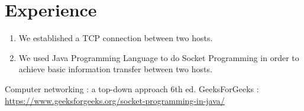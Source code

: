 \documentclass[11pt]{article}
\begin{document}
\newpage
\section{Experience}
\begin{enumerate}
\item We established a TCP connection between two hosts.
\item We used Java Programming Language to do Socket Programming in order to achieve basic information transfer between two hosts.
\end{enumerate}

\begin{thebibliography}{1}
  Computer networking : a top-down approach 6th ed.
 GeeksForGeeks : \url{https://www.geeksforgeeks.org/socket-programming-in-java/}

\end{thebibliography}
\end{document}
